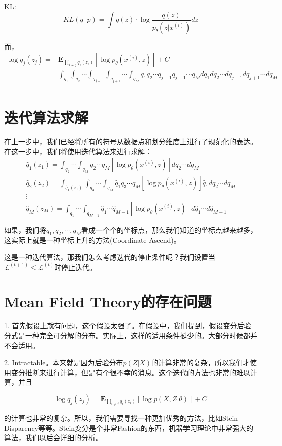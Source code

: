 \documentclass[a4paper]{article}
\begin{document}
KL:
\begin{equation}
    KL(q||p) = \int q(z)\cdot \log \frac{q(z)}{p_{\theta}(z|x^{(i)})} dz
\end{equation}

而，
\begin{equation}
    \begin{split}
        \log q_j(z_j) 
        = & \mathbf{E}_{\prod_{i \neq j} q_i(z_i)}\left[ \log p_{\theta} (x^{(i)},z) \right] + C \\
        = & \int_{q_1} \int_{q_2} \cdots \int_{q_{j-1}}\int_{q_{j+1}} \cdots \int_{q_{M}} q_1q_2\cdots q_{j-1}q_{j+1} \cdots q_M dq_1dq_2 \cdots dq_{j-1}dq_{j+1} \cdots dq_{M}  \\
    \end{split}
\end{equation}

\section{迭代算法求解}
在上一步中，我们已经将所有的符号从数据点和划分维度上进行了规范化的表达。在这一步中，我们将使用迭代算法来进行求解：
\begin{gather}
    \hat{q}_1(z_1) = \int_{q_2} \cdots \int_{q_{M}} q_2 \cdots q_M \left[ \log p_{\theta}(x^{(i)},z) \right]dq_2 \cdots dq_{M}  \\
    \hat{q}_2(z_2) = \int_{\hat{q}_1(z_1)}\int_{q_3} \cdots \int_{q_{M}} \hat{q}_1q_3 \cdots q_M \left[ \log p_{\theta}(x^{(i)},z) \right]\hat{q}_1dq_2 \cdots dq_{M}  \\
    \nonumber \vdots \\
    \hat{q}_M(z_M) = \int_{\hat{q}_1} \cdots \int_{\hat{q}_{M-1}} \hat{q}_1 \cdots \hat{q}_{M-1} \left[ \log p_{\theta}(x^{(i)},z) \right]d\hat{q}_1 \cdots d\hat{q}_{M-1}
\end{gather}

如果，我们将${q}_1,{q}_2,\cdots,{q}_M$看成一个个的坐标点，那么我们知道的坐标点越来越多，这实际上就是一种坐标上升的方法(Coordinate Ascend)。

这是一种迭代算法，那我们怎么考虑迭代的停止条件呢？我们设置当$\mathcal{L}^{(t+1)} \leq \mathcal{L}^{(t)}$时停止迭代。

\section{Mean Field Theory的存在问题}
1. 首先假设上就有问题，这个假设太强了。在假设中，我们提到，假设变分后验分式是一种完全可分解的分布。实际上，这样的适用条件挺少的。大部分时候都并不会适用。

2. Intractable。本来就是因为后验分布$p(Z|X)$的计算非常的复杂，所以我们才使用变分推断来进行计算，但是有个很不幸的消息。这个迭代的方法也非常的难以计算，并且

\begin{equation}
    \log q_j(z_j) = \mathbf{E}_{\prod_{i \neq j}q_i(z_i)}\left[ \log p(X,Z|\theta) \right] + C
\end{equation}

\noindent 的计算也非常的复杂。所以，我们需要寻找一种更加优秀的方法，比如Stein Disparency等等。Stein变分是个非常Fashion的东西，机器学习理论中非常强大的算法，我们以后会详细的分析。
\end{document}
